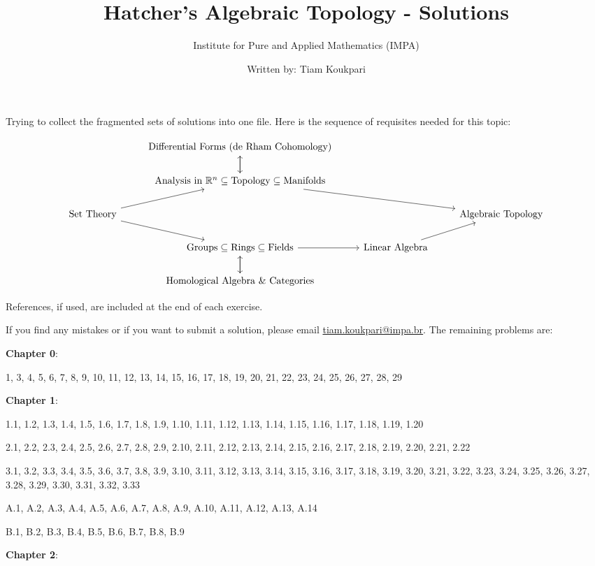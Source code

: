 \documentclass{article}
\title{Hatcher's Algebraic Topology - Solutions}
\author{Institute for Pure and Applied Mathematics (IMPA)}
\date{Written by: Tiam Koukpari}
\newcommand{\R}{\mathbb{R}}
\begin{document}
\maketitle

Trying to collect the fragmented sets of solutions into one file. Here is the sequence of requisites needed for this topic:
\bigskip

\[\begin{tikzcd}
& \textnormal{Differential Forms (de Rham Cohomology)} \arrow[d] & \\
& \textnormal{Analysis in } \R^{n} \subseteq \textnormal{Topology} \subseteq \textnormal{Manifolds} \arrow[rrd] \arrow[u] & \\
\textnormal{Set Theory} \arrow[ru] \arrow[rd] & & & \textnormal{Algebraic Topology} \\
& \textnormal{Groups} \subseteq \textnormal{Rings} \subseteq \textnormal{Fields} \arrow[r]\arrow[d] & \textnormal{Linear Algebra} \arrow[ru] & \\
& \textnormal{Homological Algebra \& Categories} \arrow[u]
\end{tikzcd}\]
\bigskip
\bigskip

References, if used, are included at the end of each exercise.
\medskip

If you find any mistakes or if you want to submit a solution, please email \href{mailto:tiam.koukpari@impa.br}{tiam.koukpari@impa.br}. The remaining problems are:
\medskip

\textbf{Chapter 0}:
\medskip

1, 3, 4, 5, 6, 7, 8, 9, 10, 11, 12, 13, 14, 15, 16, 17, 18, 19, 20, 21, 22, 23, 24, 25, 26, 27, 28, 29
\medskip

\textbf{Chapter 1}:
\medskip

1.1, 1.2, 1.3, 1.4, 1.5, 1.6, 1.7, 1.8, 1.9, 1.10, 1.11, 1.12, 1.13, 1.14, 1.15, 1.16, 1.17, 1.18, 1.19, 1.20

2.1, 2.2, 2.3, 2.4, 2.5, 2.6, 2.7, 2.8, 2.9, 2.10, 2.11, 2.12, 2.13, 2.14, 2.15, 2.16, 2.17, 2.18, 2.19, 2.20, 2.21, 2.22

3.1, 3.2, 3.3, 3.4, 3.5, 3.6, 3.7, 3.8, 3.9, 3.10, 3.11, 3.12, 3.13, 3.14, 3.15, 3.16, 3.17, 3.18, 3.19, 3.20, 3.21, 3.22, 3.23, 3.24, 3.25, 3.26, 3.27, 3.28, 3.29, 3.30, 3.31, 3.32, 3.33

A.1, A.2, A.3, A.4, A.5, A.6, A.7, A.8, A.9, A.10, A.11, A.12, A.13, A.14

B.1, B.2, B.3, B.4, B.5, B.6, B.7, B.8, B.9
\medskip

\textbf{Chapter 2}:
\medskip
\end{document}
